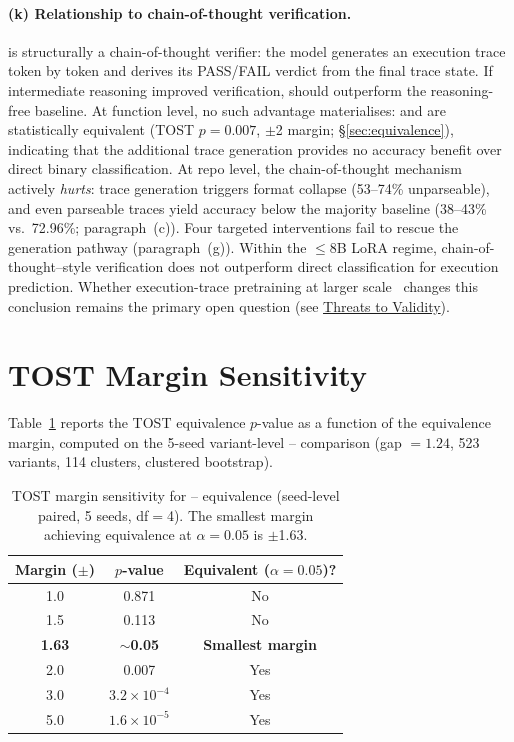 \paragraph{(k) Relationship to chain-of-thought verification.}
\cwm{} is structurally a chain-of-thought verifier: the model generates an execution trace token by token and derives its PASS/FAIL verdict from the final trace state. If intermediate reasoning improved verification, \cwm{} should outperform the reasoning-free \cls{} baseline. At function level, no such advantage materialises: \cwm{} and \cls{} are statistically equivalent (TOST $p{=}0.007$, $\pm$2\pp{} margin; \S\ref{sec:equivalence}), indicating that the additional trace generation provides no accuracy benefit over direct binary classification. At repo level, the chain-of-thought mechanism actively \emph{hurts}: trace generation triggers format collapse (53--74\% unparseable), and even parseable traces yield accuracy below the majority baseline (38--43\% vs.\ 72.96\%; paragraph~(c)). Four targeted interventions fail to rescue the generation pathway (paragraph~(g)). Within the ${\leq}$8B LoRA regime, chain-of-thought--style verification does not outperform direct classification for execution prediction. Whether execution-trace pretraining at larger scale~\cite{meta2025cwm} changes this conclusion remains the primary open question (see \hyperref[sec:threats]{Threats to Validity}).

\section{TOST Margin Sensitivity}
\label{app:tost_sensitivity}

Table~\ref{tab:tost_sensitivity} reports the TOST equivalence $p$-value as a function of the equivalence margin, computed on the 5-seed variant-level \cls{}--\cwm{} comparison (gap $= 1.24$\pp{}, 523 variants, 114 clusters, clustered bootstrap).

\begin{table}[h]
\centering
\small
\caption{TOST margin sensitivity for \cls{}--\cwm{} equivalence (seed-level paired, 5 seeds, df${=}$4). The smallest margin achieving equivalence at $\alpha = 0.05$ is $\pm$1.63\pp{}.}
\label{tab:tost_sensitivity}
\setlength{\tabcolsep}{4pt}
\begin{tabular}{ccc}
\toprule
\textbf{Margin ($\pm$\pp{})} & \textbf{$p$-value} & \textbf{Equivalent ($\alpha{=}0.05$)?} \\
\midrule
1.0 & 0.871 & No \\
1.5 & 0.113 & No \\
\textbf{1.63} & ${\sim}$\textbf{0.05} & \textbf{Smallest margin} \\
2.0 & 0.007 & Yes \\
3.0 & $3.2{\times}10^{-4}$ & Yes \\
5.0 & $1.6{\times}10^{-5}$ & Yes \\
\bottomrule
\end{tabular}
\end{table}

